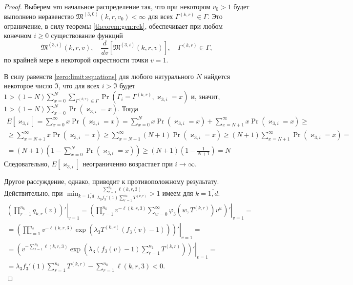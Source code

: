 \documentclass{report}
\begin{document}
\begin{proof}
Выберем это начальное распределение так, что при некотором $v_0 >1$  будет выполнено неравенство $\mathfrak{M}^{(3,0)}(k,r,v_0) <\infty$ для всех $\Gamma^{(k,r)}\in \Gamma$. Это ограничение, в силу теоремы \eqref{theorem:gen:rek}, обеспечивает при любом конечном $i\geqslant 0$ существование функций 
\begin{equation}
\mathfrak{M}^{(3,i)}(k,r,v),\quad \frac{d}{dv} \left[\mathfrak{M}^{(3,i)}(k,r,v)\right], \quad \Gamma^{(k,r)} \in \Gamma,
\end{equation}
по крайней мере в некоторой окрестности точки $v=1$.

В силу равенств \eqref{zero:limit:equations} для любого натурального $N$ найдется некоторое число $\mathfrak{I}$, что для всех $i > \mathfrak{I}$ будет
$1 > (1+N) \sum_{x=0}^{N} \sum_{\Gamma^{(k,r)}\in \Gamma}  \Pr(\Gamma_{i}=\Gamma^{(k,r)}, \varkappa_{3,i}=x)$ и, значит, $1 > (1+N) \sum_{x=0}^{N}  \Pr(\varkappa_{3,i}=x)$. Тогда
\begin{multline*}
E[\varkappa_{3,i}] = \sum_{x=0}^{\infty} x \Pr(\varkappa_{3,i}=x) = \sum_{x=0}^{N} x \Pr(\varkappa_{3,i}=x) + \sum_{x=N+1}^{\infty} x \Pr(\varkappa_{3,i}=x) \geqslant \\ \geqslant  \sum_{x=N+1}^{\infty} x \Pr(\varkappa_{3,i}=x) \geqslant \sum_{x=N+1}^{\infty} (N+1)
\Pr(\varkappa_{3,i}=x) \geqslant (N+1) \sum_{x=N+1}^{\infty} \Pr( \varkappa_{3,i}=x) =\\ =  (N+1) \left(1 - \sum_{x=0}^{N} \Pr(\varkappa_{3,i}=x)\right) \geqslant (N+1) \left(1 - \frac{1}{N+1}\right) = N
\end{multline*}
Следовательно, $E[\varkappa_{3,i}]$ неограниченно возрастает при $i \to \infty$. 

Другое рассуждение, однако, приводит к противоположному результату. Действительно, при $\min_{k=\overline{1,d}} { \frac{\sum_{r = 1}^{n_k} \ell(k,r,3) }{\lambda_3 f_3'(1) \sum_{r=1}^{n_k} T^{(k,r)} }}>1$ имеем для $k=\overline{1,d}$:
\begin{multline}
 \left.\left(\prod_{r=1}^{n_k}q_{k,r}(v)\right) ' \right|_{v=1} = 
  \left.\left(\prod_{r=1}^{n_k}v^{-\ell(k,r,3)}\sum_{w=0}^{\infty} \varphi_3(w,T^{(k,r)})v^w \right) ' \right|_{v=1} = \\ =
   \left.\left(\prod_{r=1}^{n_k} v^{-\ell(k,r,3)}\exp(\lambda_3 T^{(k,r)} (f_3(v)-1))\right) ' \right|_{v=1} = \\ =
    \left.\left(v^{-\sum_{r=1}^{n_k}\ell(k,r,3)}\exp(\lambda_3 (f_3(v)-1)\sum_{r=1}^{n_k} T^{(k,r)}) \right) ' \right|_{v=1} = \\ =
\lambda_3 f_3'(1) \sum_{r=1}^{n_k} T^{(k,r)} -\sum_{r=1}^{n_k} \ell(k,r,3)  < 0.
\label{derivative:cycle}
\end{multline}


\end{proof}
\end{document}
